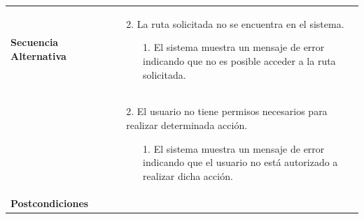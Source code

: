 \begin{longtable}{| p{4cm} | p{10cm} |}
\hline
\textbf{Secuencia Alternativa} &\mbox{}\par\vspace{-\baselineskip}
\begin{enumerate}[leftmargin=0.7cm, topsep=0.1cm]
\item[2.] La ruta solicitada no se encuentra en el sistema.
	\begin{itemize}
	\item[1.] El sistema muestra un mensaje de error indicando que no es posible acceder a la ruta solicitada.
	\end{itemize}
\end{enumerate}
\\ &\mbox{}\par\vspace{-\baselineskip}	
\begin{enumerate}[leftmargin=0.7cm, topsep=0.1cm]
\item[2.] El usuario no tiene permisos necesarios para realizar determinada acción.
	\begin{itemize}
	\item[1.] El sistema muestra un mensaje de error indicando que el usuario no está autorizado a realizar dicha acción.
	\end{itemize}
\end{enumerate}
\\

\hline
\textbf{Postcondiciones} & 
\\
\hline
\end{longtable}



\newpage
